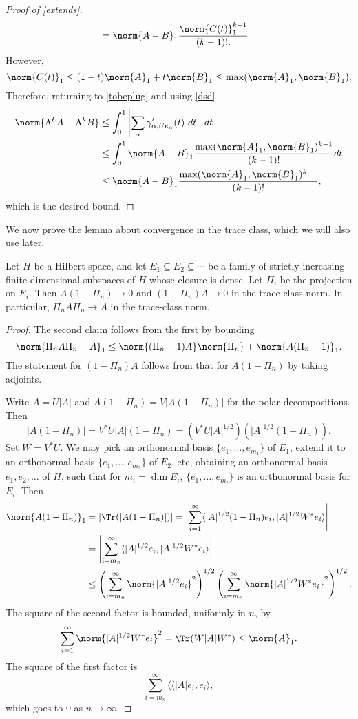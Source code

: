 \documentclass[12pt]{amsart}
\begin{document}
\begin{proof}[Proof of \cref{extends}]
\begin{align}
\begin{split}
&= \norm{A-B}_1\frac{\norm{C(t)}_1^{k-1}}{(k-1)!.}
\end{split}
\end{align}
However, \[\norm{C(t)}_1 \leq (1-t)\norm{A}_1 + t\norm{B}_1 \leq \max(\norm{A}_1,\norm{B}_1).\] Therefore, returning to \eqref{tobeplug} and using \eqref{dsd}
\begin{align*}
\norm{\Lambda^k A - \Lambda^k B} &\leq \int_0^1 \left|\sum_{\alpha} \gamma_{\alpha,Ue_{\alpha}}'(t)\ dt\right|\ dt\\
&\leq \int_0^1  \norm{A-B}_1\frac{\max(\norm{A}_1,\norm{B}_1)^{k-1}}{(k-1)!} dt\\
&\leq  \norm{A-B}_1\frac{\max(\norm{A}_1,\norm{B}_1)^{k-1}}{(k-1)!},\end{align*} which is the desired bound.
\end{proof}

We now prove the lemma about convergence in the trace class, which we will also use later.

\begin{lem}\label{traceconv}Let $H$ be a Hilbert space, and let $E_1 \subseteq E_2 \subseteq \cdots$ be a family of strictly increasing finite-dimensional subspaces of $H$ whose closure is dense. Let $\Pi_i$ be the projection on $E_i$. Then $A(1-\Pi_n) \to 0$ and $(1-\Pi_n)A \to 0$ in the trace class norm. In particular, $\Pi_n A \Pi_n \to A$ in the trace-class norm.\end{lem}
\begin{proof}
The second claim follows from the first by bounding
\[\norm{\Pi_n A \Pi_n-A}_1 \leq \norm{(\Pi_n-1)A}\norm{\Pi_n} + \norm{A(\Pi_n-1)}_1.\] The statement for $(1-\Pi_n)A$ follows from that for $A(1-\Pi_n)$ by taking adjoints.

Write $A = U|A|$ and $A(1-\Pi_n) = V|A(1-\Pi_n)|$ for the polar decompositions. Then
\[|A(1-\Pi_n)| = V^\ast U|A|(1-\Pi_n) = (V^\ast U |A|^{1/2})(|A|^{1/2}(1-\Pi_n)).\] Set $W = V^\ast U$. We may pick an orthonormal basis $\{e_1,\ldots,e_{m_1}\}$ of $E_1$, extend it to an orthonormal basis $\{e_1,\ldots,e_{m_2}\}$ of $E_2$, etc, obtaining an orthonormal basis $e_1,e_2,\ldots$ of $H$, such that for $m_i = \dim E_i$, $\{e_1,\ldots,e_{m_i}\}$ is an orthonormal basis for $E_i$. Then
\begin{align*}
\norm{A(1-\Pi_n)}_1 &= |\Tr(|A(1-\Pi_n)|)| = \left|\sum_{i=1}^{\infty} \langle |A|^{1/2}(1-\Pi_n)e_i,|A|^{1/2}W^\ast e_i\rangle\right|\\
&= \left|\sum_{i=m_n}^{\infty} \langle |A|^{1/2}e_i,|A|^{1/2}W^\ast e_i\rangle\right|\\
&\leq \left(\sum_{i=m_n}^{\infty}\norm{|A|^{1/2}e_i}^2\right)^{1/2} \left(\sum_{i=m_n}^{\infty}\norm{|A|^{1/2}W^\ast e_i}^2\right)^{1/2}.\end{align*}
The square of the second factor is bounded, uniformly in $n$, by 
\[\sum_{i=1}^{\infty}\norm{|A|^{1/2}W^\ast e_i}^2 = \Tr(W|A|W^\ast) \leq \norm{A}_1.\] The square of the first factor is
\[\sum_{i=m_n}^\infty\langle \langle|A|e_i,e_i\rangle,\] which goes to $0$ as $n \to \infty$.
\end{proof}
\end{document}
